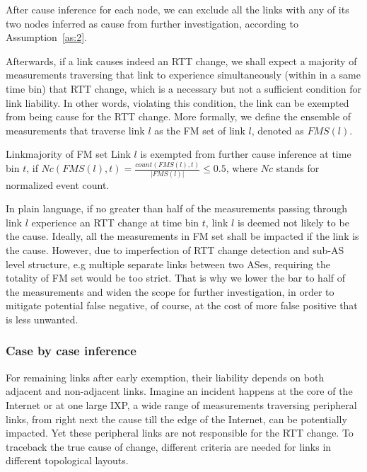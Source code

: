 After cause inference for each node, we can exclude all the links with any of its two nodes inferred as cause from further investigation, according to Assumption~\ref{as:2}.

Afterwards, if a link causes indeed an RTT change, we shall expect a majority of measurements traversing that link to experience simultaneously (within in a same time bin) that RTT change, which is a necessary but not a sufficient condition for link liability. In other words, violating this condition, the link can be exempted from being cause for the RTT change.
More formally, we define the ensemble of measurements that traverse link $l$ as the \acf{FM} set of link $l$, denoted as $FMS(l)$. 

\begin{heuristic}{Link}{majority of \ac{FM} set}\label{hu:link}
Link $l$ is exempted from further cause inference at time bin $t$, if $Nc(FMS(l), t) = \frac{count(FMS(l), t)}{|FMS(l)|} \leq 0.5$, where $Nc$ stands for normalized event count.
\end{heuristic}

In plain language, if no greater than half of the measurements passing through link $l$ experience an RTT change at time bin $t$, link $l$ is deemed not likely to be the cause. 
Ideally, all the measurements in \ac{FM} set shall be impacted if the link is the cause. However, due to imperfection of RTT change detection and sub-AS level structure, e.g multiple separate links between two ASes, requiring the totality of \ac{FM} set would be too strict. That is why we lower the bar to half of the measurements and widen the scope for further investigation, in order to mitigate potential false negative, of course, at the cost of more false positive that is less unwanted.

\subsubsection{Case by case inference}

For remaining links after early exemption, their liability depends on both adjacent and non-adjacent links. Imagine an incident happens at the core of the Internet or at one large IXP, a wide range of measurements traversing peripheral links, from right next the cause till the edge of the Internet, can be potentially impacted. Yet these peripheral links are not responsible for the RTT change. 
To traceback the true cause of change, different criteria are needed for links in different topological layouts.

